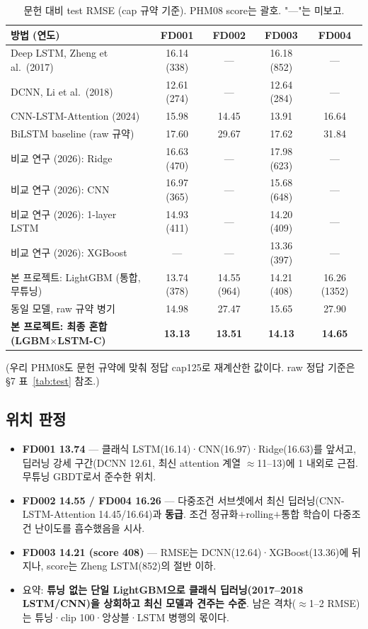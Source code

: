 \documentclass[11pt]{article}
\begin{document}
\begin{table}[H]
\centering
\caption{문헌 대비 test RMSE (cap 규약 기준). PHM08 score는 괄호. "—"는 미보고.}
\label{tab:lit}
\begin{tabular}{lcccc}
\toprule
방법 (연도) & FD001 & FD002 & FD003 & FD004 \\
\midrule
Deep LSTM, Zheng et al.\ (2017) & 16.14 (338) & — & 16.18 (852) & — \\
DCNN, Li et al.\ (2018) & 12.61 (274) & — & 12.64 (284) & — \\
CNN-LSTM-Attention (2024) & 15.98 & 14.45 & 13.91 & 16.64 \\
BiLSTM baseline (raw 규약) & 17.60 & 29.67 & 17.62 & 31.84 \\
비교 연구 (2026): Ridge & 16.63 (470) & — & 17.98 (623) & — \\
비교 연구 (2026): CNN & 16.97 (365) & — & 15.68 (648) & — \\
비교 연구 (2026): 1-layer LSTM & 14.93 (411) & — & 14.20 (409) & — \\
비교 연구 (2026): XGBoost & — & — & 13.36 (397) & — \\
\midrule
본 프로젝트: LightGBM (통합, 무튜닝) & 13.74 (378) & 14.55 (964) & 14.21 (408) & 16.26 (1352) \\
\quad 동일 모델, raw 규약 병기 & 14.98 & 27.47 & 15.65 & 27.90 \\
\textbf{본 프로젝트: 최종 혼합 (LGBM$\times$LSTM-C)} & \textbf{13.13} & \textbf{13.51} & \textbf{14.13} & \textbf{14.65} \\
\bottomrule
\end{tabular}
\end{table}

(우리 PHM08도 문헌 규약에 맞춰 정답 cap125로 재계산한 값이다. raw 정답 기준은 \S7 표~\ref{tab:test} 참조.)

\subsection{위치 판정}

\begin{itemize}[nosep]
  \item \textbf{FD001 13.74} — 클래식 LSTM(16.14)·CNN(16.97)·Ridge(16.63)를 앞서고, 딥러닝 강세 구간(DCNN 12.61, 최신 attention 계열 $\approx$11--13)에 1 내외로 근접. 무튜닝 GBDT로서 준수한 위치.
  \item \textbf{FD002 14.55 / FD004 16.26} — 다중조건 서브셋에서 최신 딥러닝(CNN-LSTM-Attention 14.45/16.64)과 \textbf{동급}. 조건 정규화$+$rolling$+$통합 학습이 다중조건 난이도를 흡수했음을 시사.
  \item \textbf{FD003 14.21 (score 408)} — RMSE는 DCNN(12.64)·XGBoost(13.36)에 뒤지나, score는 Zheng LSTM(852)의 절반 이하.
  \item 요약: \textbf{튜닝 없는 단일 LightGBM으로 클래식 딥러닝(2017--2018 LSTM/CNN)을 상회하고 최신 모델과 견주는 수준}. 남은 격차($\approx$1--2 RMSE)는 튜닝·clip 100·앙상블·LSTM 병행의 몫이다.
\end{itemize}
\end{document}
